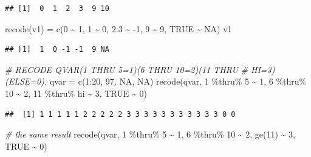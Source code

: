 \documentclass[
]{book}
\newenvironment{Shaded}{\begin{snugshade}}{\end{snugshade}}
\newcommand{\CommentTok}[1]{\textcolor[rgb]{0.56,0.35,0.01}{\textit{#1}}}
\newcommand{\ConstantTok}[1]{\textcolor[rgb]{0.00,0.00,0.00}{#1}}
\newcommand{\DecValTok}[1]{\textcolor[rgb]{0.00,0.00,0.81}{#1}}
\newcommand{\FunctionTok}[1]{\textcolor[rgb]{0.00,0.00,0.00}{#1}}
\newcommand{\NormalTok}[1]{#1}
\newcommand{\OtherTok}[1]{\textcolor[rgb]{0.56,0.35,0.01}{#1}}
\newcommand{\SpecialCharTok}[1]{\textcolor[rgb]{0.00,0.00,0.00}{#1}}
\begin{document}
\begin{verbatim}
## [1]  0  1  2  3  9 10
\end{verbatim}

\begin{Shaded}
\begin{Highlighting}[]
\FunctionTok{recode}\NormalTok{(v1) }\OtherTok{=} \FunctionTok{c}\NormalTok{(}\DecValTok{0} \SpecialCharTok{\textasciitilde{}} \DecValTok{1}\NormalTok{, }\DecValTok{1} \SpecialCharTok{\textasciitilde{}} \DecValTok{0}\NormalTok{, }\DecValTok{2}\SpecialCharTok{:}\DecValTok{3} \SpecialCharTok{\textasciitilde{}} \SpecialCharTok{{-}}\DecValTok{1}\NormalTok{, }\DecValTok{9} \SpecialCharTok{\textasciitilde{}} \DecValTok{9}\NormalTok{, }\ConstantTok{TRUE} \SpecialCharTok{\textasciitilde{}} \ConstantTok{NA}\NormalTok{)}
\NormalTok{v1}
\end{Highlighting}
\end{Shaded}

\begin{verbatim}
## [1]  1  0 -1 -1  9 NA
\end{verbatim}

\begin{Shaded}
\begin{Highlighting}[]
\CommentTok{\# RECODE QVAR(1 THRU 5=1)(6 THRU 10=2)(11 THRU}
\CommentTok{\# HI=3)(ELSE=0).}
\NormalTok{qvar }\OtherTok{=} \FunctionTok{c}\NormalTok{(}\DecValTok{1}\SpecialCharTok{:}\DecValTok{20}\NormalTok{, }\DecValTok{97}\NormalTok{, }\ConstantTok{NA}\NormalTok{, }\ConstantTok{NA}\NormalTok{)}
\FunctionTok{recode}\NormalTok{(qvar, }\DecValTok{1} \SpecialCharTok{\%thru\%} \DecValTok{5} \SpecialCharTok{\textasciitilde{}} \DecValTok{1}\NormalTok{, }\DecValTok{6} \SpecialCharTok{\%thru\%} \DecValTok{10} \SpecialCharTok{\textasciitilde{}} \DecValTok{2}\NormalTok{, }\DecValTok{11} \SpecialCharTok{\%thru\%}\NormalTok{ hi }\SpecialCharTok{\textasciitilde{}} 
  \DecValTok{3}\NormalTok{, }\ConstantTok{TRUE} \SpecialCharTok{\textasciitilde{}} \DecValTok{0}\NormalTok{)}
\end{Highlighting}
\end{Shaded}

\begin{verbatim}
##  [1] 1 1 1 1 1 2 2 2 2 2 3 3 3 3 3 3 3 3 3 3 3 0 0
\end{verbatim}

\begin{Shaded}
\begin{Highlighting}[]
\CommentTok{\# the same result}
\FunctionTok{recode}\NormalTok{(qvar, }\DecValTok{1} \SpecialCharTok{\%thru\%} \DecValTok{5} \SpecialCharTok{\textasciitilde{}} \DecValTok{1}\NormalTok{, }\DecValTok{6} \SpecialCharTok{\%thru\%} \DecValTok{10} \SpecialCharTok{\textasciitilde{}} \DecValTok{2}\NormalTok{, }\FunctionTok{ge}\NormalTok{(}\DecValTok{11}\NormalTok{) }\SpecialCharTok{\textasciitilde{}} \DecValTok{3}\NormalTok{, }
  \ConstantTok{TRUE} \SpecialCharTok{\textasciitilde{}} \DecValTok{0}\NormalTok{)}
\end{Highlighting}
\end{Shaded}
\end{document}
